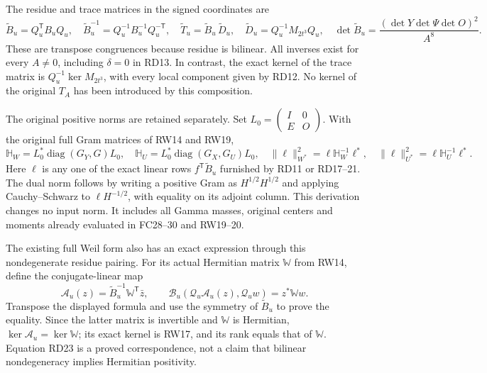 \documentclass[11pt]{article}
\begin{document}
The residue and trace matrices in the signed coordinates are
\begin{equation}
 \widetilde B_u=Q_u^{\mathsf T}B_uQ_u,\quad
 \widetilde B_u^{-1}=Q_u^{-1}B_u^{-1}Q_u^{-\mathsf T},\quad
 \widetilde T_u=\widetilde B_u\,\widetilde D_u,\quad
 \widetilde D_u=Q_u^{-1}M_{2t^3}Q_u,\quad
 \det\widetilde B_u=\frac{(\det Y\det\Psi\det O)^2}{A^8}.
 \tag{RD21}
\end{equation}
These are transpose congruences because residue is bilinear.
All inverses exist for every $A\ne0$, including $\delta=0$
in RD13. In contrast, the exact kernel of the trace matrix
is $Q_u^{-1}\ker M_{2t^3}$, with every local component
given by RD12. No kernel of the original $T_A$ has been
introduced by this composition.

The original positive norms are retained separately. Set
$L_0=\left(\begin{smallmatrix}I&0\\E&O\end{smallmatrix}\right)$.
With the original full Gram matrices of RW14 and RW19,
\begin{equation}
 \mathbb H_W=L_0^*\operatorname{diag}(G_Y,G)L_0,
 \quad
 \mathbb H_U=L_0^*\operatorname{diag}(G_X,G_U)L_0,
 \quad
 \|\ell\|_{W^*}^2=\ell\mathbb H_W^{-1}\ell^*,\quad
 \|\ell\|_{U^*}^2=\ell\mathbb H_U^{-1}\ell^* .
 \tag{RD22}
\end{equation}
Here $\ell$ is any one of the exact linear rows
$f^{\mathsf T}\widetilde B_u$ furnished by RD11 or RD17--21.
The dual norm follows by writing a positive Gram as $H^{1/2}H^{1/2}$
and applying Cauchy--Schwarz to $\ell H^{-1/2}$, with equality
on its adjoint column. This derivation changes no input norm.
It includes all Gamma masses, original centers and moments
already evaluated in FC28--30 and RW19--20.

The existing full Weil form also has an exact expression
through this nondegenerate residue pairing. For its actual
Hermitian matrix $\mathbb W$ from RW14, define the
conjugate-linear map
\begin{equation}
 \mathscr A_u(z)=\widetilde B_u^{-1}\mathbb W^{\mathsf T}\bar z,
 \qquad
 \mathcal B_u(\mathcal Q_u\mathscr A_u(z),\mathcal Q_u w)
       =z^*\mathbb Ww.
 \tag{RD23}
\end{equation}
Transpose the displayed formula and use the symmetry of
$\widetilde B_u$ to prove the equality. Since the latter
matrix is invertible and $\mathbb W$ is Hermitian,
$\ker\mathscr A_u=\ker\mathbb W$; its exact kernel is
RW17, and its rank equals that of $\mathbb W$.
Equation RD23 is a proved correspondence, not a claim that
bilinear nondegeneracy implies Hermitian positivity.
\end{document}
